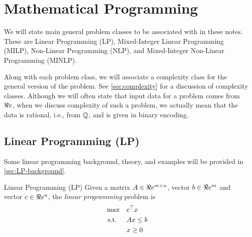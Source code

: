 

%
%

\chapter{Mathematical Programming}




We will state main general problem classes to be associated with in these notes.  These are Linear Programming (LP), Mixed-Integer Linear Programming (MILP), Non-Linear Programming (NLP), and Mixed-Integer Non-Linear Programming (MINLP).  




Along with each problem class, we will associate a complexity class for the general version of the problem.  See \autoref{sec:complexity} for a discussion of complexity classes.  Although we will often state that input data for a problem comes from $\Re e$, when we discuss complexity of such a problem, we actually mean that the data is rational, i.e., from ${\mathbb{Q}}$, and is given in binary encoding.

\section{Linear Programming (LP)}
Some linear programming background, theory, and examples will be provided in \autoref{sec:LP-background}.
\begin{general}{Linear Programming (LP)}{\polynomial}
Given a matrix $A \in \Re e^{m\times n}$, vector $b \in \Re e^m$ and vector $c \in \Re e^n$, the \emph{linear programming} problem is
\begin{equation}
\label{eq:LP}
\begin{split}
\max \quad & c^\top x\\
\mbox{ s.t. }  \quad & Ax \leq b\\
& x \geq 0
\end{split}
\end{equation}
\end{general}

